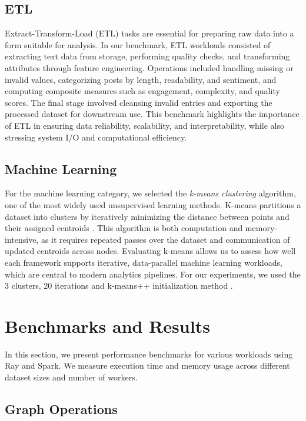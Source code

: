 \documentclass[conference]{IEEEtran}
\begin{document}
\subsection{ETL}

Extract-Transform-Load (ETL) tasks are essential for preparing raw
data into a form suitable for analysis. In our benchmark, ETL
workloads consisted of extracting text data from storage, performing
quality checks, and transforming attributes through feature
engineering. Operations included handling missing or invalid values,
categorizing posts by length, readability, and sentiment, and
computing composite measures such as engagement, complexity, and
quality scores. The final stage involved cleansing invalid entries
and exporting the processed dataset for downstream use. This
benchmark highlights the importance of ETL in ensuring data
reliability, scalability, and interpretability, while also
stressing system I/O and computational efficiency.


\subsection{Machine Learning}

For the machine learning category, we selected the \textit{k-means
clustering} algorithm, one of the most widely used unsupervised
learning methods. K-means partitions a dataset into clusters by
iteratively minimizing the distance between points and their assigned
centroids \cite{kmeans}. This algorithm is both computation and
memory-intensive, as it requires repeated passes over the dataset
and communication of updated centroids across nodes. Evaluating
k-means allows us to assess how well each framework supports
iterative, data-parallel machine learning workloads, which are
central to modern analytics pipelines. For our experiments, we
used the 3 clusters, 20 iterations and k-means++ initialization method \cite{kmeans++}.

\section{Benchmarks and Results}

In this section, we present performance benchmarks for various
workloads using Ray and Spark. We measure execution time and memory
usage across different dataset sizes and number of workers.

\subsection{Graph Operations}
\end{document}
